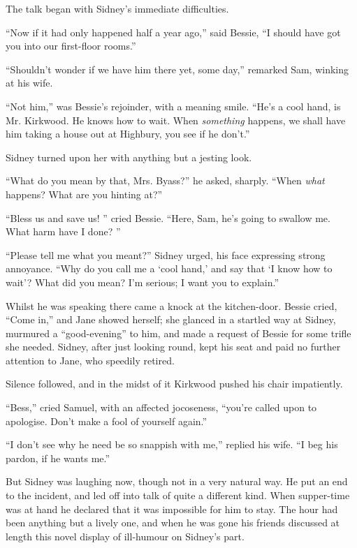 The talk began with Sidney's immediate difficulties.

``Now if it had only happened half a year ago,'' said Bessie, ``I should
have got you into our first-floor rooms.''

{\protect\hypertarget{268}{}{}}``Shouldn't wonder if we have him there
yet, some day,'' remarked Sam, winking at his wife.

``Not him,'' was Bessie's rejoinder, with a meaning smile. ``He's a cool
hand, is Mr. Kirkwood. He knows how to wait. When \emph{something}
happens, we shall have him taking a house out at Highbury, you see if he
don't.''

Sidney turned upon her with anything but a jesting look.

``What do you mean by that, Mrs. Byass?'' he asked, sharply. ``When
\emph{what} happens? What are you hinting at?''

``Bless us and save us! '' cried Bessie. ``Here, Sam, he's going to
swallow me. What harm have I done? ''

``Please tell me what you meant?'' Sidney urged, his face expressing
strong annoyance. ``Why do you call me a `cool hand,' and say that `I
know how to wait'? What did you mean? I'm serious; I want you to
explain.''

Whilst he was speaking there came a knock at the kitchen-door. Bessie
cried, ``Come in,'' and Jane showed herself; she
{\protect\hypertarget{269}{}{}}glanced in a startled way at Sidney,
murmured a ``good-evening'' to him, and made a request of Bessie for
some trifle she needed. Sidney, after just looking round, kept his seat
and paid no further attention to Jane, who speedily retired.

Silence followed, and in the midst of it Kirkwood pushed his chair
impatiently.

``Bess,'' cried Samuel, with an affected jocoseness, ``you're called
upon to apologise. Don't make a fool of yourself again.''

``I don't see why he need be so snappish with me,'' replied his wife.
``I beg his pardon, if he wants me.''

But Sidney was laughing now, though not in a very natural way. He put an
end to the incident, and led off into talk of quite a different kind.
When supper-time was at hand he declared that it was impossible for him
to stay. The hour had been anything but a lively one, and when he was
gone his friends discussed at length this novel display of ill-humour on
Sidney's part.

